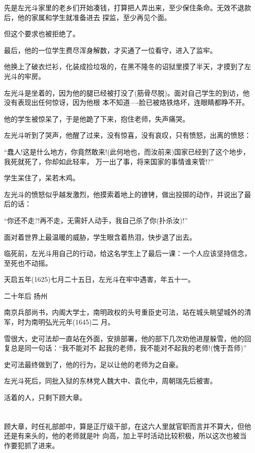 \documentclass[11pt,a4paper,onecolumn]{article}
\begin{document}
先是左光斗家里的老乡们开始凑钱，打算把人弄出来，至少保住条命。无效不退款后，他的家属和学生就准备进去
探监，至少再见个面。

但这个要求也被拒绝了。

最后，他的一位学生费尽浑身解数，才买通了一位看守，进入了监牢。

他换上了破衣烂衫，化装成捡垃圾的，在黑不隆冬的诏狱里摸了半天，才摸到了左光斗的牢房。

左光斗是坐着的，因为他的腿已经被打没了(筋骨尽脱)。面对自己学生的到访，他没有表现出任何惊讶，因为他根
本不知道----脸已被烙铁烙坏，连眼睛都睁不开。

他的学生被惊呆了，于是他跪了下来，抱住老师，失声痛哭。

左光斗听到了哭声，他醒了过来，没有惊喜，没有哀叹，只有愤怒，出离的愤怒：

``蠢人!这是什么地方，你竟然敢来!(此何地也，而汝前来)国家已经到了这个地步，我死就死了，你却如此轻率，
万一出了事，将来国家的事情谁来管!?''

学生呆住了，呆若木鸡。

左光斗的愤怒似乎越发激烈，他摸索着地上的镣铐，做出投掷的动作，并说出了最后的话：

``你还不走?!再不走，无需奸人动手，我自己杀了你(扑杀汝)!''

面对着世界上最温暖的威胁，学生眼含着热泪，快步退了出去。

临死前，左光斗用自己的行动，给这名学生上了最后一课：一个人应该坚持信念，至死也不动摇。

天启五年(1625)七月二十五日，左光斗在牢中遇害，年五十一。

二十年后 扬州

南京兵部尚书，内阁大学士，南明政权的头号重臣史可法，站在城头眺望城外的清军，时为南明弘光元年(1645)二
月。

雪很大，史可法却一直站在外面，安排部署，他的部下几次劝他进屋躲雪，他的回复总是同一句话：``我不能对不
起我的老师，我不能对不起我的老师!(愧于吾师)''

史可法最终做到了，他的行为，足以让他的老师为之自豪。

左光斗死后，同批入狱的东林党人魏大中、袁化中，周朝瑞先后被害。

活着的人，只剩下顾大章。

\section[\thesection]{}

顾大章，时任礼部郎中，算是正厅级干部，在这六人里就官职而言并不算大，但他还是有来头的，他的老师就是叶
向高，加上平时活动比较积极，所以这次也被当作要犯抓了进来。
\end{document}
